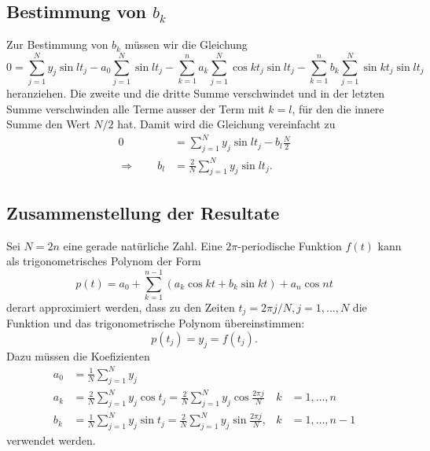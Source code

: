 \subsection{Bestimmung von $b_k$}
Zur Bestimmung von $b_k$ müssen wir die Gleichung
\[
0=\sum_{j=1}^N y_j\sin lt_j 
-a_0\sum_{j=1}^N \sin lt_j
-\sum_{k=1}^na_k\sum_{j=1}^N\cos kt_j\sin lt_j
-\sum_{k=1}^nb_k\sum_{j=1}^N\sin kt_j\sin lt_j
\]
heranziehen.
Die zweite und die dritte Summe verschwindet und in der letzten Summe
verschwinden alle Terme ausser der Term mit $k=l$, für den die
innere Summe den Wert $N/2$ hat.
Damit wird die Gleichung vereinfacht zu
\begin{align*}
0
&=
\sum_{j=1}^Ny_j\sin lt_j - b_l\frac{N}2
\\
\Rightarrow\qquad
b_l
&=
\frac{2}{N}\sum_{j=1}^Ny_j\sin lt_j.
\end{align*}

\subsection{Zusammenstellung der Resultate}
Sei $N=2n$ eine gerade natürliche Zahl.
Eine $2\pi$-periodische Funktion $f(t)$ kann als trigonometrisches Polynom
der Form
\[
p(t)
=
a_0 + \sum_{k=1}^{n-1} (a_k\cos kt + b_k\sin kt) + a_n\cos nt
\]
derart approximiert werden, dass zu den Zeiten $t_j=2\pi j/N, j=1,\dots,N$ 
die Funktion und das trigonometrische Polynom übereinstimmen:
\[
p(t_j) = y_j = f(t_j).
\]
Dazu müssen die Koefizienten
\begin{align*}
a_0
&=
\frac{1}N
\sum_{j=1}^N y_j
\\
a_k
&=
\frac{2}N
\sum_{j=1}^N y_j\cos t_j
=
\frac{2}N
\sum_{j=1}^N y_j\cos \frac{2\pi j}{N}&k&=1,\dots,n
\\
b_k
&=
\frac{1}N
\sum_{j=1}^N y_j\sin t_j
=
\frac{2}N
\sum_{j=1}^N y_j\sin \frac{2\pi j}{N},&k&=1,\dots,n-1
\end{align*}
verwendet werden.
